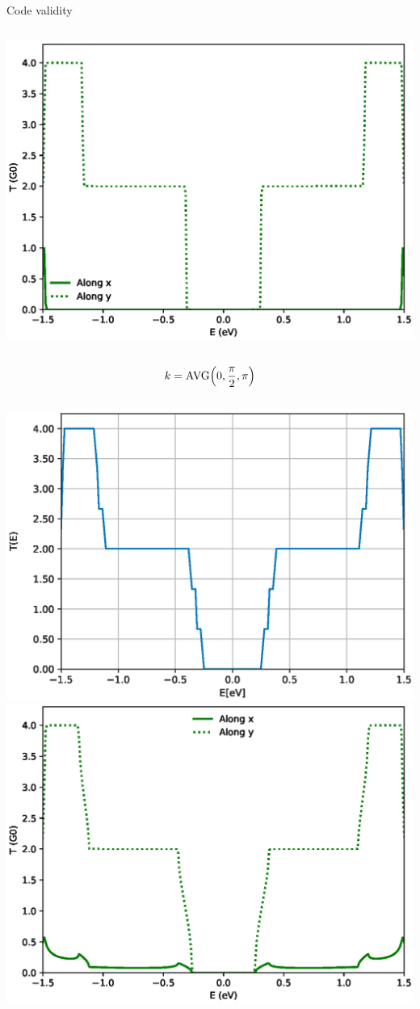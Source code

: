 \documentclass[hyperref={colorlinks=true,urlcolor=blue,linkcolor=.},aspectratio=1610,mathserif]{beamer}
\begin{document}
\begin{frame}{Code validity}
\begin{overprint}
\begin{columns}[t]
			\includegraphics[width=.87\textwidth]{Figures/txy_pi.eps}
		\end{columns}
		\centering
		\begin{align*}
			k = \mathrm{AVG}\pqty{0,\frac{\pi}{2},\pi}
		\end{align*}
		\begin{columns}[t]
			\includegraphics[width=.9\textwidth]{Figures/NPGNormal_AVER.eps}
			\includegraphics[width=.87\textwidth]{Figures/txy_AVER.eps}
		\end{columns}
	\end{overprint}
\end{frame}
\end{document}
